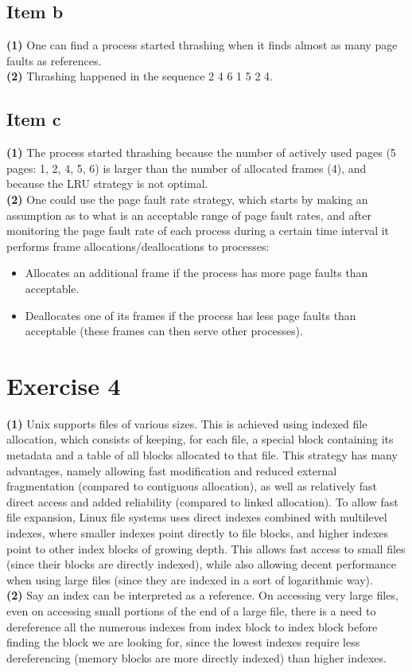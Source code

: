 {\subsection{Item b}
\textbf{(1)} One can find a process started thrashing when it finds almost as many page faults as references.\\
\textbf{(2)} Thrashing happened in the sequence 2 4 6 1 5 2 4.

\subsection{Item c}
\textbf{(1)} The process started thrashing because the number of actively used pages (5 pages: 1, 2, 4, 5, 6) is larger than the number of allocated frames (4), and because the LRU strategy is not optimal.\\
\textbf{(2)} One could use the page fault rate strategy, which starts by making an assumption as to what is an acceptable range of page fault rates, and after monitoring the page fault rate of each process during a certain time interval it performs frame allocations/deallocations to processes:
\begin{itemize}
    \item Allocates an additional frame if the process has more page faults than acceptable.
    \item Deallocates one of its frames if the process has less page faults than acceptable (these frames can then serve other processes).
\end{itemize}

\section{Exercise 4}

\textbf{(1)} Unix supports files of various sizes. This is achieved using indexed file allocation, which consists of keeping, for each file, a special block containing its metadata and a table of all blocks allocated to that file. This strategy has many advantages, namely allowing fast modification and reduced external fragmentation (compared to contiguous allocation), as well as relatively fast direct access and added reliability (compared to linked allocation). To allow fast file expansion, Linux file systems uses direct indexes combined with multilevel indexes, where smaller indexes point directly to file blocks, and higher indexes point to other index blocks of growing depth. This allows fast access to small files (since their blocks are directly indexed), while also allowing decent performance when using large files (since they are indexed in a sort of logarithmic way).\\
\textbf{(2)} Say an index can be interpreted as a reference. On accessing very large files, even on accessing small portions of the end of a large file, there is a need to dereference all the numerous indexes from index block to index block before finding the block we are looking for, since the lowest indexes require less dereferencing (memory blocks are more directly indexed) than higher indexes.

}
